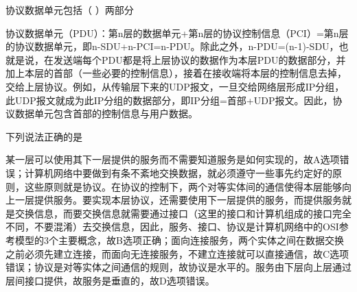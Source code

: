 \question 协议数据单元包括（ ）两部分
\par{}
\begin{solution}协议数据单元（PDU）：第n层的数据单元+第n层的协议控制信息（PCI）=第n层的协议数据单元，即n-SDU+n-PCI=n-PDU。除此之外，n-PDU=(n-1)-SDU，也就是说，在发送端每个PDU都是将上层协议的数据作为本层PDU的数据部分，并加上本层的首部（一些必要的控制信息），接着在接收端将本层的控制信息去掉，交给上层协议。例如，从传输层下来的UDP报文，一旦交给网络层形成IP分组，此UDP报文就成为此IP分组的数据部分，即IP分组=首部+UDP报文。因此，协议数据单元包含首部的控制信息与用户数据。
\end{solution}
\question 下列说法正确的是
\par{}
\begin{solution}某一层可以使用其下一层提供的服务而不需要知道服务是如何实现的，故A选项错误；计算机网络中要做到有条不紊地交换数据，就必须遵守一些事先约定好的原则，这些原则就是协议。在协议的控制下，两个对等实体间的通信使得本层能够向上一层提供服务。要实现本层协议，还需要使用下一层提供的服务，而提供服务就是交换信息，而要交换信息就需要通过接口（这里的接口和计算机组成的接口完全不同，不要混淆）去交换信息，因此，服务、接口、协议是计算机网络中的OSI参考模型的3个主要概念，故B选项正确；面向连接服务，两个实体之间在数据交换之前必须先建立连接，而面向无连接服务，不建立连接就可以直接通信，故C选项错误；协议是对等实体之间通信的规则，故协议是水平的。服务由下层向上层通过层间接口提供，故服务是垂直的，故D选项错误。
\end{solution}
